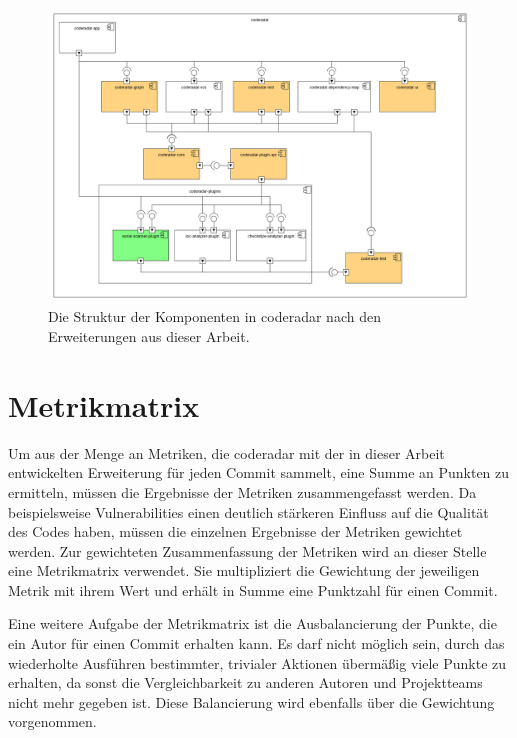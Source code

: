\documentclass[
	oneside,  %
	ngerman, 
	final, 
	11pt, 
	a4paper, 
	1.1headlines, 
	headinclude=false, 
	footinclude=false, 
	mpinclude=false, 
	pagesize, 
	onecolumn, 
	titlepage, 
	parskip=half, 
	headsepline, 
	chapterprefix=false, 
	version=first, 
	listof=totoc, 
	bibliography=totoc, 
	toc=graduated, 
	fleqn
]{scrbook}
\begin{document}
\begin{figure}[H]
	\begin{center}
		\includegraphics[width=\linewidth]{images/coderadar_components}
		\caption{Die Struktur der Komponenten in coderadar nach den Erweiterungen aus dieser Arbeit.}
		\label{component_diagram}
	\end{center}
\end{figure}

\section{Metrikmatrix}
\label{Metrikmatrix}
Um aus der Menge an Metriken, die coderadar mit der in dieser Arbeit entwickelten Erweiterung für jeden Commit sammelt, eine Summe an Punkten zu ermitteln, müssen die Ergebnisse der Metriken zusammengefasst werden.
Da beispielsweise Vulnerabilities einen deutlich stärkeren Einfluss auf die Qualität des Codes haben, müssen die einzelnen Ergebnisse der Metriken gewichtet werden.
Zur gewichteten Zusammenfassung der Metriken wird an dieser Stelle eine Metrikmatrix verwendet.
Sie multipliziert die Gewichtung der jeweiligen Metrik mit ihrem Wert und erhält in Summe eine Punktzahl für einen Commit.

Eine weitere Aufgabe der Metrikmatrix ist die Ausbalancierung der Punkte, die ein Autor für einen Commit erhalten kann.
Es darf nicht möglich sein, durch das wiederholte Ausführen bestimmter, trivialer Aktionen übermäßig viele Punkte zu erhalten, da sonst die Vergleichbarkeit zu anderen Autoren und Projektteams nicht mehr gegeben ist.
Diese Balancierung wird ebenfalls über die Gewichtung vorgenommen.
\end{document}
